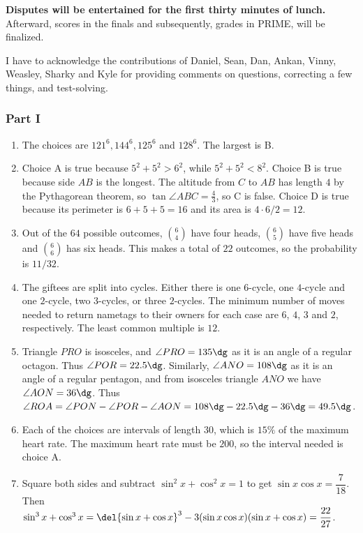 \documentclass[10pt,paper=letter]{scrartcl}
\begin{document}
\noindent
\textbf{Disputes will be entertained for the first thirty minutes of lunch.} Afterward, scores in the finals and subsequently, grades in PRIME, will be finalized.

I have to acknowledge the contributions of Daniel, Sean, Dan, Ankan, Vinny, Weasley, Sharky and Kyle for providing comments on questions, correcting a few things, and test-solving.

\newpage

\subsubsection*{Part I}

\begin{enumerate}
  \item The choices are $121^6, 144^6, 125^6$ and $128^6$. The largest is B.
  \item Choice A is true because $5^2 + 5^2 > 6^2$, while $5^2 + 5^2 < 8^2$. Choice B is true because side $AB$ is the longest. The altitude from $C$ to $AB$ has length $4$ by the Pythagorean theorem, so $\tan \angle ABC = \frac43$, so C is false. Choice D is true because its perimeter is $6+5+5 = 16$ and its area is $4\cdot6/2 = 12$.
  \item Out of the $64$ possible outcomes, $\binom64$ have four heads, $\binom65$ have five heads and $\binom66$ has six heads. This makes a total of $22$ outcomes, so the probability is $11/32$.
  \item The giftees are split into cycles. Either there is one $6$-cycle, one $4$-cycle and one $2$-cycle, two $3$-cycles, or three $2$-cycles. The minimum number of moves needed to return nametags to their owners for each case are $6$, $4$, $3$ and $2$, respectively. The least common multiple is $12$.
  \item Triangle $PRO$ is isosceles, and $\angle PRO = 135\dg$ as it is an angle of a regular octagon. Thus $\angle POR = 22.5\dg$. Similarly, $\angle ANO = 108\dg$ as it is an angle of a regular pentagon, and from isosceles triangle $ANO$ we have $\angle AON = 36\dg$. Thus $\angle ROA = \angle PON - \angle POR - \angle AON = 108\dg - 22.5\dg - 36\dg = 49.5\dg$.
  \item Each of the choices are intervals of length $30$, which is $15\%$ of the maximum heart rate. The maximum heart rate must be $200$, so the interval needed is choice A.
  \item Square both sides and subtract $\sin^2 x + \cos^2 x = 1$ to get $\sin x \cos x = \dfrac7{18}$. Then $\sin^3 x + \cos^3 x = \del{\sin x + \cos x}^3 - 3(\sin x \cos x)(\sin x + \cos x) = \dfrac{22}{27}$.

\end{enumerate}
\end{document}
